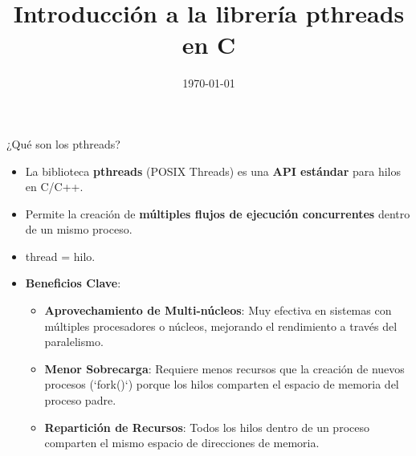 \documentclass{beamer}
\title{Introducción a la librería pthreads en C}
\institute{Programación de Alto Rendimiento} %
\date{\today}
\begin{document}
\frame{\titlepage}

\begin{frame}{¿Qué son los pthreads?}
    \begin{itemize}
        \item La biblioteca \textbf{pthreads} (POSIX Threads) es una \textbf{API estándar} para hilos en C/C++.
        \item Permite la creación de \textbf{múltiples flujos de ejecución concurrentes} dentro de un mismo proceso.
        \item thread = hilo.
        \item \textbf{Beneficios Clave}:
        \begin{itemize}
            \item \textbf{Aprovechamiento de Multi-núcleos}: Muy efectiva en sistemas con múltiples procesadores o núcleos, mejorando el rendimiento a través del paralelismo.
            \item \textbf{Menor Sobrecarga}: Requiere menos recursos que la creación de nuevos procesos (`fork()`) porque los hilos comparten el espacio de memoria del proceso padre.
            \item \textbf{Repartición de Recursos}: Todos los hilos dentro de un proceso comparten el mismo espacio de direcciones de memoria.
        \end{itemize}
    \end{itemize}
\end{frame}
\end{document}
